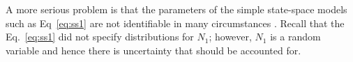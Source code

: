 \documentclass[12pt]{article}
\begin{document}
A more serious problem %
is that the parameters of the simple state-space models
such as Eq~\ref{eq:ss1} are not identifiable in many
circumstances \citep{polansky_etal:2009}. Recall that the
Eq.~\ref{eq:ss1} did not specify distributions for $N_1$; %
however, $N_1$ is a random variable and hence there is uncertainty
that should be accounted for.  
\end{document}
